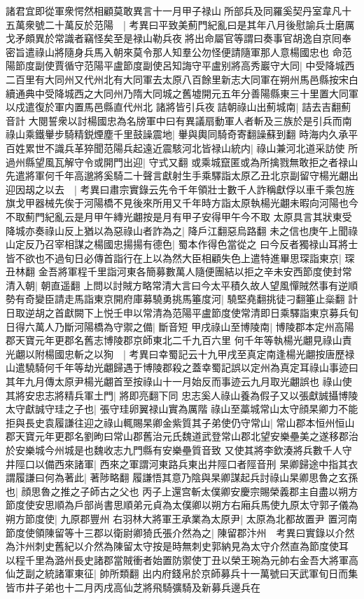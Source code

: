 諸君宜即從軍衆愕然相顧莫敢異言十一月甲子禄山所部兵及同羅奚契丹室韋凡十五萬衆號二十萬反於范陽　|{
	考異曰平致美薊門紀亂曰是其年八月後慰諭兵士磨厲戈矛頗異於常識者竊怪矣至是禄山勒兵夜將出命屬官等謂曰奏事官胡逸自京囘奉密旨遣祿山將隨身兵馬入朝來莫令那人知羣公勿怪便請隨軍那人意楊國忠也}
命范陽節度副使賈循守范陽平盧節度副使呂知誨守平盧别將高秀巖守大同|{
	中受降城西二百里有大同州又代州北有大同軍去太原八百餘里新志大同軍在朔州馬邑縣按宋白續通典中受降城西之大同州乃隋大同城之舊墟開元五年分善陽縣東三十里置大同軍以戍遣復於軍内置馬邑縣直代州北}
諸將皆引兵夜詰朝祿山出薊城南|{
	詰去吉翻薊音計}
大閱誓衆以討楊國忠為名牓軍中曰有異議扇動軍人者斬及三族於是引兵而南祿山乘鐵轝步騎精鋭煙塵千里鼓譟震地|{
	轝與輿同騎奇寄翻譟蘇到翻}
時海内久承平百姓累世不識兵革猝聞范陽兵起遠近震駭河北皆禄山統内|{
	祿山兼河北道采訪使}
所過州縣望風瓦解守令或開門出迎|{
	守式又翻}
或乘城竄匿或為所擒戮無敢拒之者禄山先遣將軍何千年高邈將奚騎二十聲言獻射生手乘驛詣太原乙丑北京副留守楊光翽出迎因刼之以去　|{
	考異曰肅宗實錄云先令千年領壯士數千人詐稱獻俘以車千乘包旌旗戈甲器械先俟于河陽橋不見後來所用又千年時方詣太原執楊光翽未暇向河陽也今不取薊門紀亂云是月甲午縳光翽按是月有甲子安得甲午今不取}
太原具言其狀東受降城亦奏祿山反上猶以為惡祿山者詐為之|{
	降戶江翻惡烏路翻}
未之信也庚午上聞祿山定反乃召宰相謀之楊國忠揚揚有德色|{
	蜀本作得色當從之}
曰今反者獨禄山耳將士皆不欲也不過旬日必傳首詣行在上以為然大臣相顧失色上遣特進畢思琛詣東京|{
	琛丑林翻}
金吾將軍程千里詣河東各簡募數萬人隨便團結以拒之辛未安西節度使封常清入朝|{
	朝直遥翻}
上問以討賊方略常清大言曰今太平積久故人望風憚賊然事有逆順勢有奇變臣請走馬詣東京開府庫募驍勇挑馬箠度河|{
	驍堅堯翻挑徒刁翻箠止橤翻}
計日取逆胡之首獻闕下上悦壬申以常清為范陽平盧節度使常清即日乘驛詣東京募兵旬日得六萬人乃斷河陽橋為守禦之備|{
	斷音短}
甲戌祿山至博陵南|{
	博陵郡本定州高陽郡天寶元年更郡名舊志博陵郡京師東北二千九百六里}
何千年等執楊光翽見祿山責光翽以附楊國忠斬之以狥　|{
	考異曰幸蜀記云十九甲戌至真定南逢楊光翽按唐歷禄山遣驍騎何千年等劫光翽歸遇于博陵郡殺之蓋幸蜀記誤以定州為真定耳祿山事迹曰其年九月傳太原尹楊光翽首至按祿山十一月始反而事迹云九月取光翽誤也}
祿山使其將安忠志將精兵軍土門|{
	將即亮翻下同}
忠志奚人祿山養為假子又以張獻誠攝博陵太守獻誠守珪之子也|{
	張守珪卵翼禄山實為厲階}
祿山至藁城常山太守顔杲卿力不能拒與長史袁履謙往迎之祿山輒賜杲卿金紫質其子弟使仍守常山|{
	常山郡本恒州恒山郡天寶元年更郡名劉昫曰常山郡舊治元氏魏道武登常山郡北望安樂壘美之遂移郡治於安樂城今州城是也魏收志九門縣有安樂壘質音致}
又使其將李欽湊將兵數千人守井陘口以備西來諸軍|{
	西來之軍謂河東路兵東出井陘口者陘音刑}
杲卿歸途中指其衣謂履謙曰何為著此|{
	著陟略翻}
履謙悟其意乃陰與杲卿謀起兵討祿山杲卿思魯之玄孫也|{
	顔思魯之推之子師古之父也}
丙子上還宫斬太僕卿安慶宗賜榮義郡主自盡以朔方節度使安思順為戶部尚書思順弟元貞為太僕卿以朔方右廂兵馬使九原太守郭子儀為朔方節度使|{
	九原郡豐州}
右羽林大將軍王承業為太原尹|{
	太原為北都故置尹}
置河南節度使領陳留等十三郡以衛尉卿猗氏張介然為之|{
	陳留郡汴州　考異曰實錄以介然為汴州刺史舊紀以介然為陳留太守按是時無刺史郭納見為太守介然直為節度使耳}
以程千里為潞州長史諸郡當賊衝者始置防禦使丁丑以榮王琬為元帥右金吾大將軍高仙芝副之統諸軍東征|{
	帥所類翻}
出内府錢帛於京師募兵十一萬號曰天武軍旬日而集皆市井子弟也十二月丙戌高仙芝將飛騎彍騎及新募兵邊兵在

